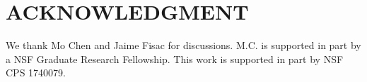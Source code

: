 \documentclass[letterpaper, 10 pt, conference]{ieeeconf}  %
\begin{document}

\section*{ACKNOWLEDGMENT}
We thank Mo Chen and Jaime Fisac for discussions.
M.C. is supported in part by a NSF Graduate Research Fellowship.
This work is supported in part by NSF CPS 1740079.


\addtolength{\textheight}{-2cm}   %


\end{document}
